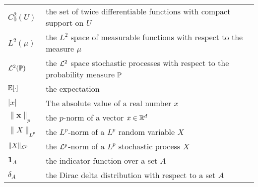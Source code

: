 \begin{tabular}{ll}
  $C^2_0(U)$         & the set of twice differentiable functions with compact support on $U$               \\
  $L^2(\mu)$         & the $L^2$ space of measurable functions with respect to the measure $\mu$           \\
 $\mathcal{L}^2(\mathbb{P})$        & the $\mathcal{L}^2$ space stochastic processes with respect to the probability measure $\mathbb{P}$ \\
 $\mathbb{E}[\cdot]$       & the expectation                                                                     \\
 $|x|$              & The absolute value of a real number $x$                                             \\
 $\|\mathbf{x}\|_p$ & the $p$-norm of a vector $x\in\mathbb{R}^d$                                                \\
 $\|X\|_{L^p}$ & the $L^p$-norm of a $L^p$ random variable $X$                                              \\
 $\|X\|_{\mathcal{L}^p}$ & the $\mathcal{L}^p$-norm of a $L^p$ stochastic process $X$                                              \\
 $\mathbf{1}_A$     & the indicator function over a set $A$                                               \\
 $\delta_A$         & the Dirac delta distribution with respect to a set $A$                              \\

\end{tabular}
\renewcommand{\arraystretch}{1}
